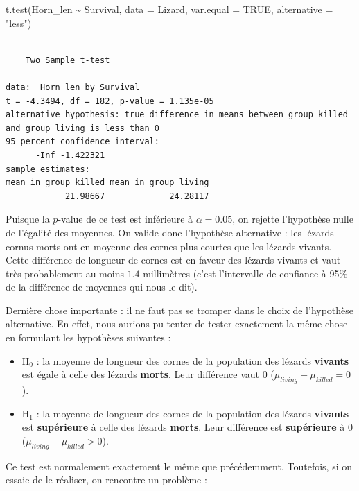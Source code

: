 \documentclass[
  french,
  a4paper,
  DIV=11,
  numbers=noendperiod,
  oneside]{scrreprt}
\newenvironment{Shaded}{}{}
\newcommand{\AttributeTok}[1]{\textcolor[rgb]{0.84,0.23,0.29}{#1}}
\newcommand{\ConstantTok}[1]{\textcolor[rgb]{0.00,0.36,0.77}{#1}}
\newcommand{\FunctionTok}[1]{\textcolor[rgb]{0.44,0.26,0.76}{#1}}
\newcommand{\NormalTok}[1]{\textcolor[rgb]{0.14,0.16,0.18}{#1}}
\newcommand{\SpecialCharTok}[1]{\textcolor[rgb]{0.00,0.36,0.77}{#1}}
\newcommand{\StringTok}[1]{\textcolor[rgb]{0.01,0.18,0.38}{#1}}
\providecommand{\tightlist}{%
  \setlength{\itemsep}{0pt}\setlength{\parskip}{0pt}}
\begin{document}
\begin{Shaded}
\begin{Highlighting}[]
\FunctionTok{t.test}\NormalTok{(Horn\_len }\SpecialCharTok{\textasciitilde{}}\NormalTok{ Survival, }\AttributeTok{data =}\NormalTok{ Lizard, }\AttributeTok{var.equal =} \ConstantTok{TRUE}\NormalTok{,}
       \AttributeTok{alternative =} \StringTok{"less"}\NormalTok{)}
\end{Highlighting}
\end{Shaded}

\begin{verbatim}

    Two Sample t-test

data:  Horn_len by Survival
t = -4.3494, df = 182, p-value = 1.135e-05
alternative hypothesis: true difference in means between group killed and group living is less than 0
95 percent confidence interval:
      -Inf -1.422321
sample estimates:
mean in group killed mean in group living 
            21.98667             24.28117 
\end{verbatim}

Puisque la \(p\)-value de ce test est inférieure à \(\alpha = 0.05\), on
rejette l'hypothèse nulle de l'égalité des moyennes. On valide donc
l'hypothèse alternative : les lézards cornus morts ont en moyenne des
cornes plus courtes que les lézards vivants. Cette différence de
longueur de cornes est en faveur des lézards vivants et vaut très
probablement au moins \(1.4\) millimètres (c'est l'intervalle de
confiance à 95\% de la différence de moyennes qui nous le dit).

Dernière chose importante : il ne faut pas se tromper dans le choix de
l'hypothèse alternative. En effet, nous aurions pu tenter de tester
exactement la même chose en formulant les hypothèses suivantes :

\begin{itemize}
\tightlist
\item
  H\(_0\) : la moyenne de longueur des cornes de la population des
  lézards \textbf{vivants} est égale à celle des lézards \textbf{morts}.
  Leur différence vaut 0 (\(\mu_{living}-\mu_{killed} = 0\)).
\item
  H\(_1\) : la moyenne de longueur des cornes de la population des
  lézards \textbf{vivants} est \textbf{supérieure} à celle des lézards
  \textbf{morts}. Leur différence est \textbf{supérieure} à 0
  (\(\mu_{living}-\mu_{killed} > 0\)).
\end{itemize}

Ce test est normalement exactement le même que précédemment. Toutefois,
si on essaie de le réaliser, on rencontre un problème :
\end{document}
